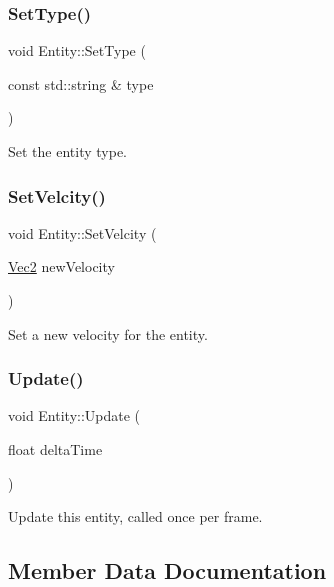 \subsubsection{\texorpdfstring{Set\+Type()}{SetType()}}
{\footnotesize\ttfamily void Entity\+::\+Set\+Type (\begin{DoxyParamCaption}\item[{const std\+::string \&}]{type }\end{DoxyParamCaption})}

Set the entity type. \mbox{\label{class_entity_ade1dea9daf20aeaf47fef4f0126a2860}} 
\subsubsection{\texorpdfstring{Set\+Velcity()}{SetVelcity()}}
{\footnotesize\ttfamily void Entity\+::\+Set\+Velcity (\begin{DoxyParamCaption}\item[{\mbox{\hyperlink{struct_vec2}{Vec2}}}]{new\+Velocity }\end{DoxyParamCaption})}

Set a new velocity for the entity. \mbox{\label{class_entity_a64043a3f77405466222ff997e272924f}} 
\subsubsection{\texorpdfstring{Update()}{Update()}}
{\footnotesize\ttfamily void Entity\+::\+Update (\begin{DoxyParamCaption}\item[{float}]{delta\+Time }\end{DoxyParamCaption})\hspace{0.3cm}{\ttfamily [virtual]}}

Update this entity, called once per frame. 

\subsection{Member Data Documentation}
\mbox{\label{class_entity_a5f53550a89ee6303d64c8de9e3ade02a}} 
